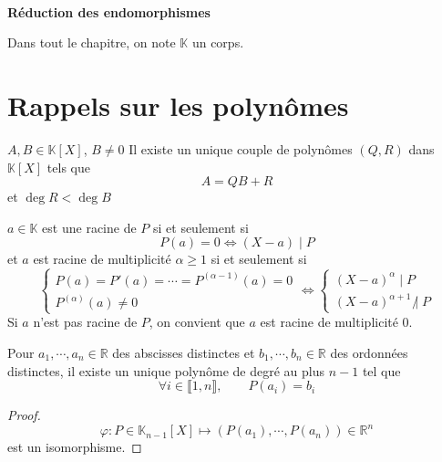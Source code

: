 \ifsolo
    ~

    \vspace{1cm}

    \begin{center}
        \textbf{\LARGE Réduction des endomorphismes} \\[1em]
    \end{center}
    \tableofcontents
\else
    \minitoc
\fi
\thispagestyle{empty}

\ifsolo \newpage \setcounter{page}{1} \fi

Dans tout le chapitre, on note $\mathbb K$ un corps.

\section{Rappels sur les polynômes}

\begin{thm}
    \Hyp $A, B\in \mathbb K[X]$, $B\neq 0$
    \Conc Il existe un unique couple de polynômes $(Q, R)$ dans $\mathbb K[X]$ tels que \[
        A=QB+R
    \]
    et $\deg R<\deg B$
\end{thm}

\begin{thmdef}
    $a\in\mathbb K$ est une racine de $P$ si et seulement si \[
    P(a)=0\iff (X-a)\;|\;P
\]
et $a$ est racine de multiplicité $\alpha \geq 1$ si et seulement si \[
    \begin{cases}
        P(a)=P'(a)=\cdots=P^{(\alpha - 1)}(a)=0 \\
        P^{(\alpha)}(a)\neq 0
    \end{cases}
    \iff \begin{cases}
        (X-a)^\alpha \; |\; P\\
        (X-a)^{\alpha+1}\;\not|\;P
    \end{cases}
\]
Si $a$ n'est pas racine de $P$, on convient que $a$ est racine de multiplicité $0$.
\end{thmdef}

\begin{thm}
     Pour $a_1, \cdots, a_n\in\mathbb R$ des abscisses distinctes et $b_1, \cdots, b_n\in\mathbb R$ des ordonnées distinctes, il existe un unique polynôme de degré au plus $n-1$ tel que \[
        \forall i\in\llbracket 1, n\rrbracket, \qquad P(a_i)=b_i
    \]
\end{thm}
\begin{proof}
    \[
        \varphi:P\in\mathbb K_{n-1}[X]\longmapsto (P(a_1), \cdots, P(a_n))\in\mathbb R^n
    \]
    est un isomorphisme.
\end{proof}

